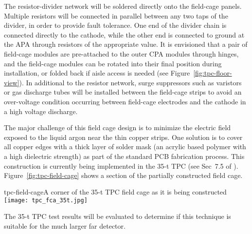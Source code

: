 The resistor-divider network will be soldered directly onto the
field-cage panels. Multiple resistors will be connected in parallel
between any two taps of the divider, in order to provide fault
tolerance. One end of the divider chain is connected directly to the
cathode, while the other end is connected to ground at the APA through
resistors of the appropriate value.  It is envisioned that a pair of
field-cage modules are pre-attached to the outer CPA modules through
hinges, and the field-cage modules can be rotated into their final
position during installation, or folded back if aisle access is needed
(see Figure~\ref{fig:tpc-floor-view}).  In additional to the resistor
network, surge suppressors such as varistors or gas discharge tubes
will be installed between the field-cage strips to avoid an
over-voltage condition occurring between field-cage electrodes and the
cathode in a high voltage discharge.

The major challenge of this field cage design is to minimize the
electric field exposed to the liquid argon near the thin copper
strips.  One solution is to cover all copper edges with a thick layer
of solder mask (an acrylic based polymer with a high dielectric
strength) as part of the standard PCB fabrication process.  This
construction is currently being implemented in the 35-t TPC (see
Sec~7.5 of \anxlbnefd).  Figure~\ref{fig:tpc-field-cage} shows a
section of the partially constructed field cage.  
\begin{cdrfigure}{tpc-field-cage}{A corner of the 35-t TPC 
field cage as it is being constructed}
\texttt{[image: tpc\_fca\_35t.jpg]}
\end{cdrfigure}
The 35-t TPC test results will be evaluated to determine if this
technique is suitable for the much larger far detector.
 
